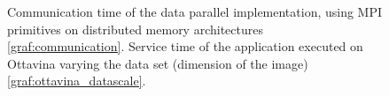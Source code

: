\begin{figure}[p]
\centering
{}
\caption{ Communication time of the data parallel implementation, using MPI primitives on distributed memory architectures \ref{graf:communication}. Service time of the application executed on Ottavina varying the data set (dimension of the image) \ref{graf:ottavina_datascale}. }
\label{chart:ottavina_comm}
\end{figure}

